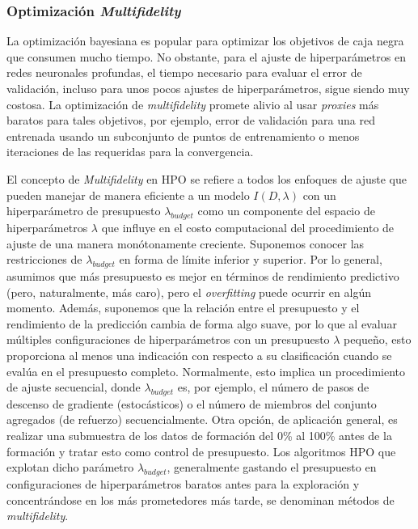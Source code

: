 \subsubsection{Optimización \textit{Multifidelity}}



La optimización bayesiana es popular para optimizar los objetivos de caja negra que consumen mucho tiempo. No obstante, para el ajuste de hiperparámetros en redes neuronales profundas, el tiempo necesario para evaluar el error de validación, incluso para unos pocos ajustes de hiperparámetros, sigue siendo muy costosa. La optimización de \textit{multifidelity} promete alivio al usar \emph{proxies} más baratos para tales objetivos, por ejemplo, error de validación para una red entrenada usando un subconjunto de puntos de entrenamiento o menos iteraciones de las requeridas para la convergencia. \cite{wu2019practical}

El concepto de \textit{Multifidelity} en HPO se refiere a todos los enfoques de ajuste que pueden manejar de manera eficiente a un modelo $I(D, \lambda)$ con un hiperparámetro de presupuesto $\lambda_{budget}$ como un componente del espacio de hiperparámetros $\lambda$ que influye en el costo computacional del procedimiento de ajuste de una manera monótonamente creciente. Suponemos conocer las restricciones de $\lambda_{budget}$ en forma de límite inferior y superior. Por lo general, asumimos que más presupuesto es mejor en términos de rendimiento predictivo (pero, naturalmente, más caro), pero el \textit{overfitting} puede ocurrir en algún momento. Además, suponemos que la relación entre el presupuesto y el rendimiento de la predicción cambia de forma algo suave, por lo que al evaluar múltiples configuraciones de hiperparámetros con un presupuesto $\lambda$ pequeño, esto proporciona al menos una indicación con respecto a su clasificación cuando se evalúa en el presupuesto completo. Normalmente, esto implica un procedimiento de ajuste secuencial, donde $\lambda_{budget}$ es, por ejemplo,  el número de pasos de descenso de gradiente (estocásticos) o el número de miembros del conjunto agregados (de refuerzo) secuencialmente. Otra opción, de aplicación general, es realizar una submuestra de los datos de formación del 0\% al 100\% antes de la formación y tratar esto como control de presupuesto. Los algoritmos HPO que explotan dicho parámetro $\lambda_{budget}$, generalmente gastando el presupuesto en configuraciones de hiperparámetros baratos antes para la exploración y concentrándose en los más prometedores más tarde, se denominan métodos de \textit{multifidelity}.

